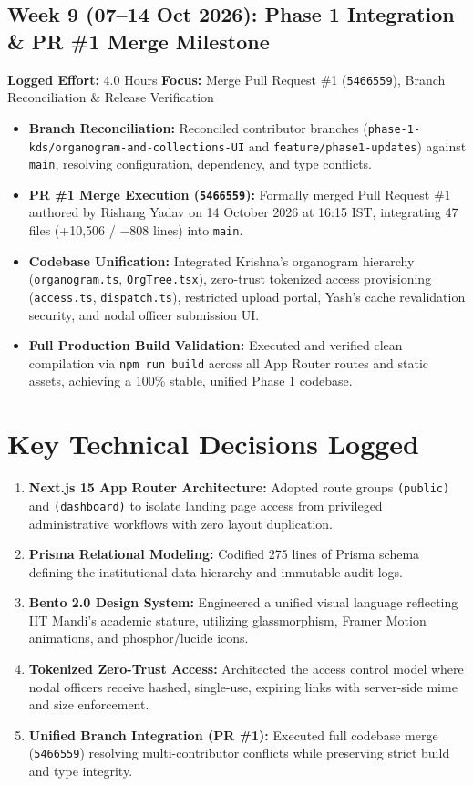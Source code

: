 \documentclass[11pt,a4paper]{article}
\begin{document}
\subsection*{Week 9 (07--14 Oct 2026): Phase 1 Integration \& PR \#1 Merge Milestone}
\textbf{Logged Effort:} 4.0 Hours \quad \textbf{Focus:} Merge Pull Request \#1 (\texttt{5466559}), Branch Reconciliation \& Release Verification
\begin{itemize}[leftmargin=1.4em, itemsep=2pt]
\item \textbf{Branch Reconciliation:} Reconciled contributor branches (\texttt{phase-1-kds/organogram-and-collections-UI} and \texttt{feature/phase1-updates}) against \texttt{main}, resolving configuration, dependency, and type conflicts.
\item \textbf{PR \#1 Merge Execution (\texttt{5466559}):} Formally merged Pull Request \#1 authored by Rishang Yadav on 14 October 2026 at 16:15 IST, integrating 47 files (+10,506 / $-$808 lines) into \texttt{main}.
\item \textbf{Codebase Unification:} Integrated Krishna's organogram hierarchy (\texttt{organogram.ts}, \texttt{OrgTree.tsx}), zero-trust tokenized access provisioning (\texttt{access.ts}, \texttt{dispatch.ts}), restricted upload portal, Yash's cache revalidation security, and nodal officer submission UI.
\item \textbf{Full Production Build Validation:} Executed and verified clean compilation via \texttt{npm run build} across all App Router routes and static assets, achieving a 100\% stable, unified Phase 1 codebase.
\end{itemize}

\section*{Key Technical Decisions Logged}
\begin{enumerate}[leftmargin=1.6em, itemsep=2pt]
\item \textbf{Next.js 15 App Router Architecture:} Adopted route groups \texttt{(public)} and \texttt{(dashboard)} to isolate landing page access from privileged administrative workflows with zero layout duplication.
\item \textbf{Prisma Relational Modeling:} Codified 275 lines of Prisma schema defining the institutional data hierarchy and immutable audit logs.
\item \textbf{Bento 2.0 Design System:} Engineered a unified visual language reflecting IIT Mandi's academic stature, utilizing glassmorphism, Framer Motion animations, and phosphor/lucide icons.
\item \textbf{Tokenized Zero-Trust Access:} Architected the access control model where nodal officers receive hashed, single-use, expiring links with server-side mime and size enforcement.
\item \textbf{Unified Branch Integration (PR \#1):} Executed full codebase merge (\texttt{5466559}) resolving multi-contributor conflicts while preserving strict build and type integrity.
\end{enumerate}
\end{document}

